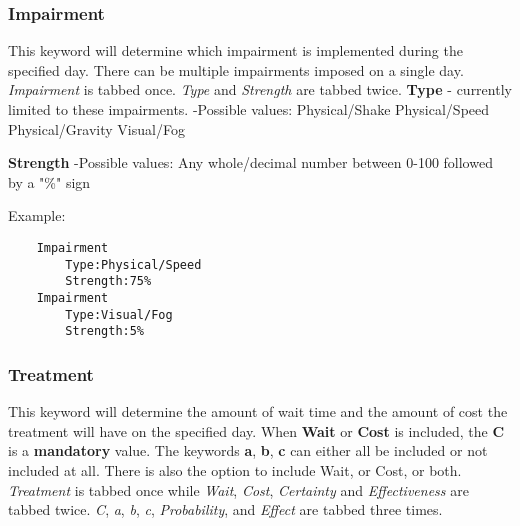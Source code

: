 \documentclass{article}
\begin{document}
\subsubsection{Impairment}
This keyword will determine which impairment is implemented during the specified day. There can be multiple impairments imposed on a single day. \textit{Impairment} is tabbed once. \textit{Type} and \textit{Strength} are tabbed twice. \newline\newline
\textbf{Type} - currently limited to these impairments.\newline
\indent-Possible values:\newline
\indent\indent Physical/Shake\newline
\indent\indent Physical/Speed\newline
\indent\indent Physical/Gravity\newline
\indent\indent Visual/Fog\newline


\noindent\textbf{Strength}\newline
\indent-Possible values:\newline
\indent\indent Any whole/decimal number between 0-100 followed by a "\%" sign \newline
    
\noindent Example:
\begin{lstlisting}
    Impairment
        Type:Physical/Speed
        Strength:75%
    Impairment
        Type:Visual/Fog
        Strength:5%
\end{lstlisting}

\subsubsection{Treatment}
This keyword will determine the amount of wait time and the amount of cost the treatment will have on the specified day. When \textbf{Wait} or \textbf{Cost} is included, the \textbf{C} is a \textbf{mandatory} value. The keywords \textbf{a}, \textbf{b}, \textbf{c} can either all be included or not included at all. There is also the option to include Wait, or Cost, or both.
\newline \textit{Treatment} is tabbed once while \textit{Wait}, \textit{Cost}, \textit{Certainty} and \textit{Effectiveness} are tabbed twice. \textit{C}, \textit{a}, \textit{b}, \textit{c}, \textit{Probability}, and \textit{Effect} are tabbed three times.\newline
\end{document}
